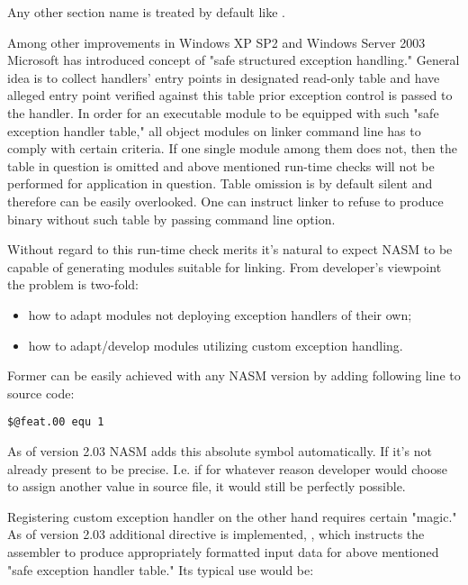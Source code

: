 Any other section name is treated by default like .


Among other improvements in Windows XP SP2 and Windows Server 2003
Microsoft has introduced concept of "safe structured exception
handling." General idea is to collect handlers' entry points in
designated read-only table and have alleged entry point verified
against this table prior exception control is passed to the handler. In
order for an executable module to be equipped with such "safe exception
handler table," all object modules on linker command line has to comply
with certain criteria. If one single module among them does not, then
the table in question is omitted and above mentioned run-time checks
will not be performed for application in question. Table omission is by
default silent and therefore can be easily overlooked. One can instruct
linker to refuse to produce binary without such table by passing
 command line option.

Without regard to this run-time check merits it's natural to expect
NASM to be capable of generating modules suitable for 
linking. From developer's viewpoint the problem is two-fold:

\begin{itemize}
    \item{how to adapt modules not deploying exception handlers of their own;}
    \item{how to adapt/develop modules utilizing custom exception handling.}
\end{itemize}

Former can be easily achieved with any NASM version by adding following
line to source code:

\begin{lstlisting}
$@feat.00 equ 1
\end{lstlisting}

As of version 2.03 NASM adds this absolute symbol automatically. If
it's not already present to be precise. I.e. if for whatever reason
developer would choose to assign another value in source file, it would
still be perfectly possible.

Registering custom exception handler on the other hand requires certain
"magic." As of version 2.03 additional directive is implemented,
, which instructs the assembler to produce appropriately
formatted input data for above mentioned "safe exception handler
table." Its typical use would be:

